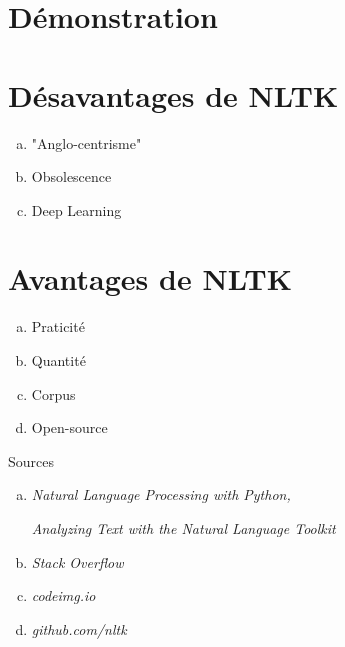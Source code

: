 \section{Démonstration}

\section{Désavantages de NLTK}

\begin{frame}{\secname}
\begin{alertblock}{}
\begin{enumerate}[a)]
	\item "Anglo-centrisme"
	\item Obsolescence
	\item Deep Learning
\end{enumerate}
\end{alertblock}


\end{frame}

\section{Avantages de NLTK}

\begin{frame}{\secname}
\begin{alertblock}{}
\begin{enumerate}[a)]
	\item Praticité
	\item Quantité
	\item Corpus
	\item Open-source
\end{enumerate}
\end{alertblock}
\end{frame}

\begin{frame}{Sources}
	\begin{alertblock}{}
\begin{enumerate}[a)]
\item \textit{Natural Language Processing with Python,} \par \textit{Analyzing Text with the Natural Language Toolkit}
\item \textit{Stack Overflow}
\item \textit{codeimg.io}
\item \textit{github.com/nltk}
\end{enumerate}
\end{alertblock}
\end{frame}

